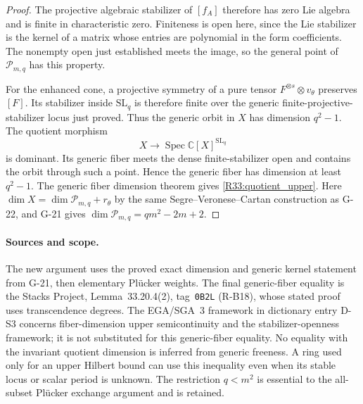 \begin{proof}
The projective algebraic stabilizer of $[f_A]$ therefore has
zero Lie algebra and is finite in characteristic zero.
Finiteness is open here, since the Lie stabilizer is the
kernel of a matrix whose entries are polynomial in the form
coefficients. The nonempty open just established meets the
image, so the general point of $\mathcal P_{m,q}$ has this
property.

For the enhanced cone, a projective symmetry of a pure tensor
$F^{\otimes s}\otimes v_\theta$ preserves $[F]$. Its stabilizer
inside $\mathrm{SL}_q$ is therefore finite over the generic
finite-projective-stabilizer locus just proved. Thus the
generic orbit in $X$ has dimension $q^2-1$.
The quotient morphism
\[
 X\longrightarrow\operatorname{Spec}\mathbb C[X]^{\mathrm{SL}_q}
\]
is dominant. Its generic fiber meets the dense finite-stabilizer
open and contains the orbit through such a point. Hence the
generic fiber has dimension at least $q^2-1$.
The generic fiber dimension theorem gives
\eqref{R33:quotient_upper}. Here
$\dim X=\dim\mathcal P_{m,q}+r_\theta$ by the same
Segre--Veronese--Cartan construction as G-22, and G-21 gives
$\dim\mathcal P_{m,q}=q m^2-2m+2$.
\end{proof}

\paragraph{Sources and scope.}
The new argument uses the proved exact dimension and generic
kernel statement from G-21, then elementary Pl\"ucker weights.
The final generic-fiber equality is the Stacks Project,
Lemma~33.20.4(2), tag~\texttt{0B2L} (R-B18), whose stated
proof uses transcendence degrees. The EGA/SGA~3 framework
in dictionary entry D-S3 concerns fiber-dimension upper
semicontinuity and the stabilizer-openness framework; it
is not substituted for this generic-fiber equality.
No equality with the invariant quotient dimension is inferred
from generic freeness. A ring used only for an upper Hilbert
bound can use this inequality even when its stable locus or
scalar period is unknown. The restriction $q<m^2$ is essential
to the all-subset Pl\"ucker exchange argument and is retained.

